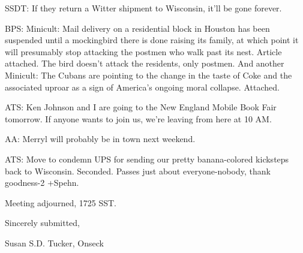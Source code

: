 \documentclass[12pt]{article}
\begin{document}
SSDT: If they return a Witter shipment to Wisconsin, it'll be gone forever.

BPS: Minicult: Mail delivery on a residential block in Houston has been suspended until a mockingbird there is done raising its family, at which point it will presumably stop attacking the postmen who walk past its nest. Article attached. The bird doesn't attack the residents, only postmen. And another Minicult: The Cubans are pointing to the change in the taste of Coke and the associated uproar as a sign of America's ongoing moral collapse. Attached.

ATS: Ken Johnson and I are going to the New England Mobile Book Fair tomorrow. If anyone wants to join us, we're leaving from here at 10 AM.

AA: Merryl will probably be in town next weekend.

ATS: Move to condemn UPS for sending our pretty banana-colored kicksteps back to Wisconsin. Seconded. Passes just about everyone-nobody, thank goodness-2 +Spehn.

\vspace{12pt}

\noindent
Meeting adjourned, 1725 SST.

\vspace{18pt}

\centerline{Sincerely submitted,}
\centerline{Susan S.D. Tucker, Onseck}
\end{document}
